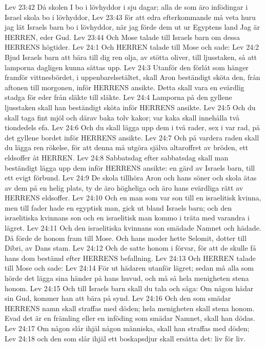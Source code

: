 Lev 23:42  Då skolen I bo i lövhyddor i sju dagar; alla de som äro infödingar i Israel skola bo i lövhyddor,
Lev 23:43  för att edra efterkommande må veta huru jag lät Israels barn bo i lövhyddor, när jag förde dem ut ur Egyptens land Jag är HERREN, eder Gud.
Lev 23:44  Och Mose talade till Israels barn om dessa HERRENS högtider.
Lev 24:1  Och HERREN talade till Mose och sade:
Lev 24:2  Bjud Israels barn att bära till dig ren olja, av stötta oliver, till ljusstaken, så att lamporna dagligen kunna sättas upp.
Lev 24:3  Utanför den förlåt som hänger framför vittnesbördet, i uppenbarelsetältet, skall Aron beständigt sköta den, från aftonen till morgonen, inför HERRENS ansikte. Detta skall vara en evärdlig stadga för eder från släkte till släkte.
Lev 24:4  Lamporna på den gyllene ljusstaken skall han beständigt sköta inför HERRENS ansikte.
Lev 24:5  Och du skall taga fint mjöl och därav baka tolv kakor; var kaka skall innehålla två tiondedels efa.
Lev 24:6  Och du skall lägga upp dem i två rader, sex i var rad, på det gyllene bordet inför HERRENS ansikte.
Lev 24:7  Och på vardera raden skall du lägga ren rökelse, för att denna må utgöra själva altaroffret av bröden, ett eldsoffer åt HERREN.
Lev 24:8  Sabbatsdag efter sabbatsdag skall man beständigt lägga upp dem inför HERRENS ansikte: en gärd av Israels barn, till ett evigt förbund.
Lev 24:9  De skola tillhöra Aron och hans söner och skola ätas av dem på en helig plats, ty de äro högheliga och äro hans evärdliga rätt av HERRENS eldsoffer.
Lev 24:10  Och en man som var son till en israelitisk kvinna, men till fader hade en egyptisk man, gick ut bland Israels barn; och den israelitiska kvinnans son och en israelitisk man kommo i träta med varandra i lägret.
Lev 24:11  Och den israelitiska kvinnans son smädade Namnet och hädade. Då förde de honom fram till Mose. Och hans moder hette Selomit, dotter till Dibri, av Dans stam.
Lev 24:12  Och de satte honom i förvar, för att de skulle få hans dom bestämd efter HERRENS befallning.
Lev 24:13  Och HERREN talade till Mose och sade:
Lev 24:14  För ut hädaren utanför lägret; sedan må alla som hörde det lägga sina händer på hans huvud, och må så hela menigheten stena honom.
Lev 24:15  Och till Israels barn skall du tala och säga: Om någon hädar sin Gud, kommer han att bära på synd.
Lev 24:16  Och den som smädar HERRENS namn skall straffas med döden; hela menigheten skall stena honom. Evad det är en främling eller en inföding som smädar Namnet, skall han dödas.
Lev 24:17  Om någon slår ihjäl någon människa, skall han straffas med döden;
Lev 24:18  och den som slår ihjäl ett boskapsdjur skall ersätta det: liv för liv.
